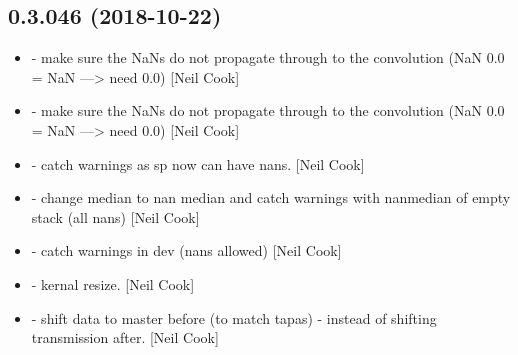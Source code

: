 \documentclass[a4paper,10pt,english]{report}
\begin{document}
\subsection{0.3.046 (2018-10-22)}
\label{\detokenize{misc/changelog:id285}}\begin{itemize}
\item {} 
 - make sure the NaNs do not propagate through to the
convolution (NaN \sphinxtitleref{*} 0.0 = NaN —\textgreater{} need 0.0) {[}Neil Cook{]}

\item {} 
 - make sure the NaNs do not propagate through to the
convolution (NaN \sphinxtitleref{*} 0.0 = NaN —\textgreater{} need 0.0) {[}Neil Cook{]}

\item {} 
 - catch warnings as sp now can have nans. {[}Neil Cook{]}

\item {} 
 - change median to nan median and catch
warnings with nanmedian of empty stack (all nans) {[}Neil Cook{]}

\item {} 
 - catch warnings in dev (nans allowed) {[}Neil Cook{]}

\item {} 
 - kernal resize. {[}Neil Cook{]}

\item {} 
 - shift data to master before (to match tapas) -
instead of shifting transmission after. {[}Neil Cook{]}

\end{itemize}
\end{document}

